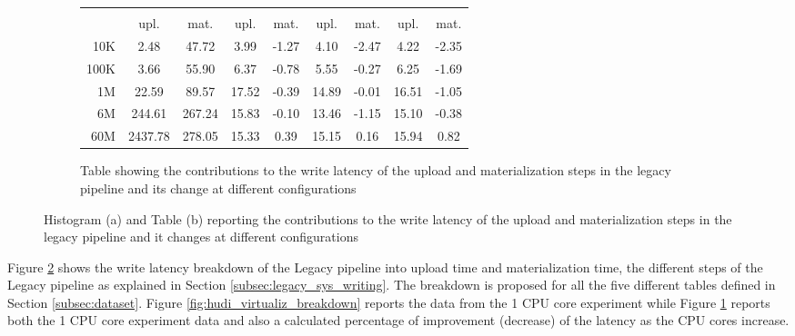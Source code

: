 \begin{figure}
    \begin{subfigure}[b]{\textwidth}
        \begin{tabular}{r S[table-format=4.2] S[table-format=4.2] S[table-format=2.2] S[table-format=2.2] S[table-format=2.2] S[table-format=2.2] S[table-format=2.2] S[table-format=2.2]} 
            \toprule
             &  &  &  & \\
            & {upl.} & {mat.} & {upl.} & {mat.} & {upl.} & {mat.} & {upl.} & {mat.}\\
            \midrule
            10K &  2.48 & 47.72 & 3.99 & -1.27 & 4.10 & -2.47 & 4.22 & -2.35\\
            100K & 3.66 & 55.90 & 6.37 & -0.78 & 5.55 & -0.27 & 6.25 & -1.69\\
            1M   & 22.59 & 89.57 & 17.52 & -0.39 & 14.89 & -0.01 & 16.51 & -1.05\\
            6M   & 244.61 & 267.24 & 15.83 & -0.10 & 13.46 & -1.15 & 15.10 & -0.38\\
            60M &  2437.78 & 278.05 & 15.33 & 0.39 & 15.15 & 0.16 & 15.94 & 0.82\\
            \bottomrule
        \end{tabular}
        \caption{Table showing the contributions to the write latency of the upload and materialization steps in the legacy pipeline and its change at different  configurations}
        \label{tbl:hudi_virtualiz_breakdown_cpu_perc}
    \end{subfigure}
    \caption{Histogram (a) and Table (b) reporting the contributions to the write latency of the upload and materialization steps in the legacy pipeline and it changes at different  configurations}
    \label{fig_tbl:hudi_virtualiz_breakdown}
\end{figure}

Figure \ref{fig_tbl:hudi_virtualiz_breakdown} shows the write latency breakdown of the Legacy pipeline into upload time and materialization time, the different steps of the Legacy pipeline as explained in Section \ref{subsec:legacy_sys_writing}. The breakdown is proposed for all the five different tables defined in Section \ref{subsec:dataset}. Figure \ref{fig:hudi_virtualiz_breakdown} reports the data from the 1 \gls{CPU} core experiment while Figure \ref{tbl:hudi_virtualiz_breakdown_cpu_perc} reports both the 1 \gls{CPU} core experiment data and also a calculated percentage of improvement (decrease) of the latency as the \gls{CPU} cores increase.

